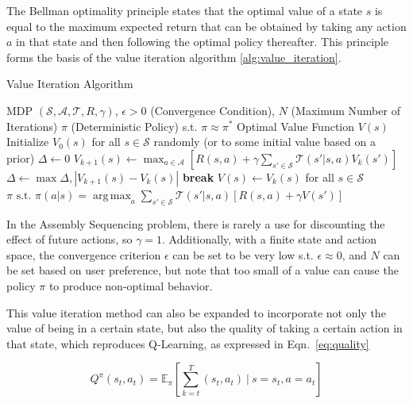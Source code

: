 \documentclass{article}
\DeclareMathOperator*{\argmax}{arg\,max}
\begin{document}
The Bellman optimality principle states that the optimal value of a state $s$ is equal to the maximum expected return that can be obtained by taking any action $a$ in that state and then following the optimal policy thereafter. This principle forms the basis of the value iteration algorithm \ref{alg:value_iteration}.
\begin{algorithm}[H]
    \caption{Value Iteration Algorithm}
    \label{alg:value_iteration}
    \begin{algorithmic}[1]
        \Require MDP $(\mathcal{S}, \mathcal{A}, \mathcal{T}, R, \gamma)$, 
        \Require $\epsilon > 0$  (Convergence Condition), $N$ (Maximum Number of Iterations)
        \Ensure $\pi$ (Deterministic Policy) s.t. $\pi \approx \pi^*$
        \Ensure Optimal Value Function $V(s)$
        \State Initialize $V_0(s)$ for all $s \in \mathcal{S}$ randomly (or to some initial value based on a prior)
        \State $\Delta \gets 0$
        \State $V_{k+1}(s) \gets \max_{a \in \mathcal{A}} \left [R(s,a) + \gamma \sum_{s' \in \mathcal{S}} \mathcal{T}(s' | s,a) V_k(s') \right ]$
        \State $\Delta \gets \max {\Delta, |V_{k+1}(s) - V_k(s)|}$
        \EndFor
        \If{$\Delta < \epsilon$}
        \State \textbf{break}
        \EndIf
        \EndFor
        \State $V(s) \gets V_k(s)$ for all $s \in \mathcal{S}$
        \State \Return $\pi \text { s.t. } \pi(a|s)=\argmax_{a} \sum_{s'\in\mathcal{S}} \mathcal{T}(s'|s,a)\left[R(s,a)+\gamma V(s')\right]$
    \end{algorithmic}
\end{algorithm}

In the Assembly Sequencing problem, there is rarely a use for discounting the effect of future actions, so $\gamma = 1$. Additionally, with a finite state and action space, the convergence criterion $\epsilon$ can be set to be very low s.t. $\epsilon \approx 0$, and $N$ can be set based on user preference, but note that too small of a value can cause the policy $\pi$ to produce non-optimal behavior.

This value iteration method can also be expanded to incorporate not only the value of being in a certain state, but also the quality of taking a certain action in that state, which reproduces Q-Learning, as expressed in Eqn.~\ref{eq:quality}

\begin{equation}\label{eq:quality}
    Q^\pi\left(s_t, a_t\right)=\mathbb{E}_\pi\left[\sum_{k=t}^T \left(s_t, a_t\right)\ \bigg|\ s=s_t, a=a_t\right]
\end{equation}
\end{document}

